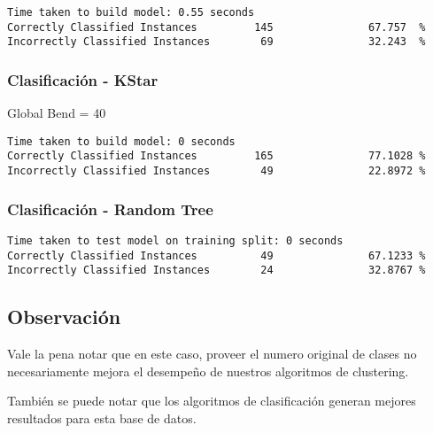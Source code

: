 \documentclass[a4paper]{article}
\begin{document}
\begin{verbatim}
Time taken to build model: 0.55 seconds
Correctly Classified Instances         145               67.757  %
Incorrectly Classified Instances        69               32.243  %
\end{verbatim}

\subsubsection{Clasificación - KStar}

Global Bend = 40
\begin{verbatim}
Time taken to build model: 0 seconds
Correctly Classified Instances         165               77.1028 %
Incorrectly Classified Instances        49               22.8972 %
\end{verbatim}

\subsubsection{Clasificación - Random Tree}

\begin{verbatim}
Time taken to test model on training split: 0 seconds
Correctly Classified Instances          49               67.1233 %
Incorrectly Classified Instances        24               32.8767 %
\end{verbatim}

\subsection*{Observación}
Vale la pena notar que en este caso, proveer el numero original
de clases no necesariamente mejora el desempeño de nuestros algoritmos
de clustering.

También se puede notar que los algoritmos de clasificación generan
mejores resultados para esta base de datos.

\end{document}

